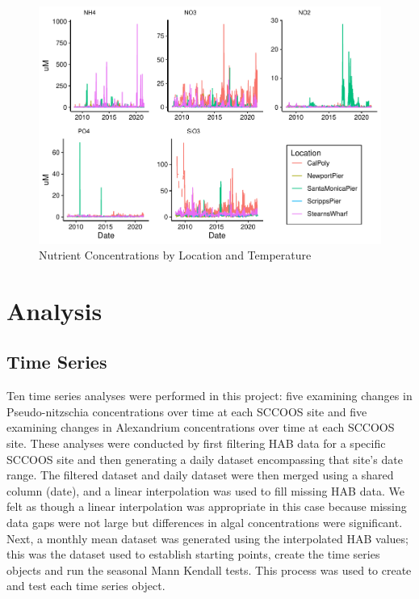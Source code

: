 \documentclass[
  12pt,
]{article}
\begin{document}
\begin{figure}
\centering
\includegraphics{Habs_Final_Report_files/figure-latex/Exploratory Analysis Part 3-1.pdf}
\caption{Nutrient Concentrations by Location and Temperature}
\end{figure}

\newpage

\hypertarget{analysis}{%
\section{Analysis}\label{analysis}}

\hypertarget{time-series}{%
\subsection{Time Series}\label{time-series}}

Ten time series analyses were performed in this project: five examining
changes in Pseudo-nitzschia concentrations over time at each SCCOOS site
and five examining changes in Alexandrium concentrations over time at
each SCCOOS site. These analyses were conducted by first filtering HAB
data for a specific SCCOOS site and then generating a daily dataset
encompassing that site's date range. The filtered dataset and daily
dataset were then merged using a shared column (date), and a linear
interpolation was used to fill missing HAB data. We felt as though a
linear interpolation was appropriate in this case because missing data
gaps were not large but differences in algal concentrations were
significant. Next, a monthly mean dataset was generated using the
interpolated HAB values; this was the dataset used to establish starting
points, create the time series objects and run the seasonal Mann Kendall
tests. This process was used to create and test each time series object.
\end{document}
